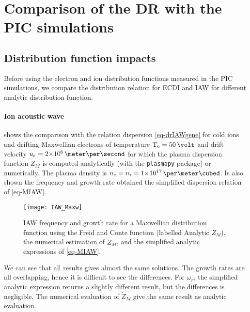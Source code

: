 
\section{Comparison of the \ac{DR} with the \ac{PIC} simulations}
  \label{sec-DR-results}
  
  
  \subsection{Distribution function impacts} \label{subsec-DRimpact}
    Before using the electron and ion distribution functions measured in the \ac{PIC} simulations, we compare the distribution relation for \ac{ECDI} and \ac{IAW} for different analytic distribution function.
    
    \paragraph{Ion acoustic wave\\}
    
     shows the comparison with the relation dispersion \cref{eq-drIAWgene} for cold ions and drifting Maxwellian electrons of temperature $\Te=50\,\volt$ and drift velocity $u_e = \sn{2}{6} \,\meter\per\second$ for which the plasma dispersion function $Z_M$ is computed analytically (with the \texttt{plasmapy} package) or numerically.
    The plasma density is $n_e = n_i = \sn{1}{17} \,\per\meter\cubed$.
    Is also shown the frequency and growth rate obtained the simplified dispersion relation of \cref{eq-MIAW}. 
    
    \begin{figure}[hbtp]
      \centering
      \texttt{[image: IAW\_Maxw]}
      \caption{\ac{IAW} frequency and growth rate for a Maxwellian distribution function using the Freid and Conte function (labelled Analytic $Z_M$), the numerical estimation of $\tilde{Z}_M$, and the simplified analytic expressions of \cref{eq-MIAW}. }
      \label{fig-IAW_Maxw}
    \end{figure}
    
    We can see that all results gives almost the same solutions.
    The growth rates are all overlapping, hence it is difficult to see the differences.
    For $\omega_r$, the simplified analytic expression returns a slightly different result, but the differences is negligible.
    The numerical evaluation of $\tilde{Z}_M$ give the same result as analytic evaluation.
    
